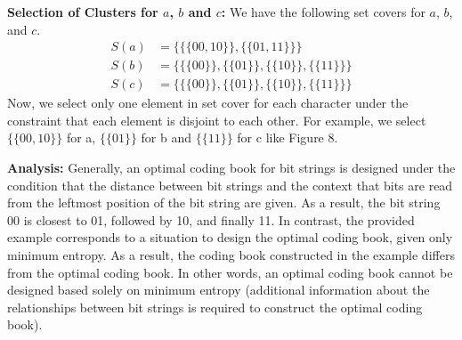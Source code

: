 \textbf{Selection of Clusters for $a$, $b$ and $c$: }
We have the following set covers for $a$, $b$, and $c$.
\begin{align}
\label{cluster_result}
    S(a)&=\{\{\{00,10\}\},\{\{01,11\}\}\}\\
    S(b)&=\{\{\{00\}\},\{\{01\}\},\{\{10\}\},\{\{11\}\}\}\\
    S(c)&=\{\{\{00\}\},\{\{01\}\},\{\{10\}\},\{\{11\}\}\}
\end{align}
Now, we select only one element in set cover for each character 
under the constraint that each element is disjoint to each other. 
For example, we select $\{\{00,10\}\}$ for a, $\{\{01\}\}$ for b and $\{\{11\}\}$ for c
like Figure 8.  



\textbf{Analysis: }
Generally, an optimal coding book for bit strings is designed under the condition 
that the distance between bit strings and the context that bits are read 
from the leftmost position of the bit string are given.
As a result, the bit string 00 is closest to 01, followed by 10, and finally 11.
In contrast, the provided example corresponds to a situation 
to design the optimal coding book, given only minimum entropy.
As a result, the coding book constructed in the example differs from the optimal coding book.
In other words, an optimal coding book cannot be designed based solely on minimum entropy
(additional information about the relationships between bit strings is required to construct the optimal coding book).

